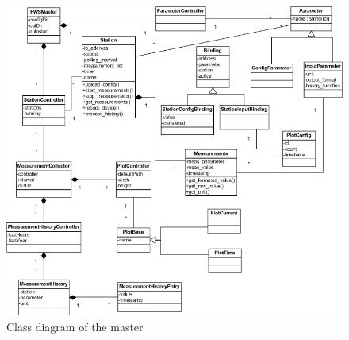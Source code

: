 \begin{figure}[ht]
    \centering
    \includegraphics[width=\linewidth]{master/class.png}
    \caption{Class diagram of the master}
    \label{fig:class_master}
\end{figure}



